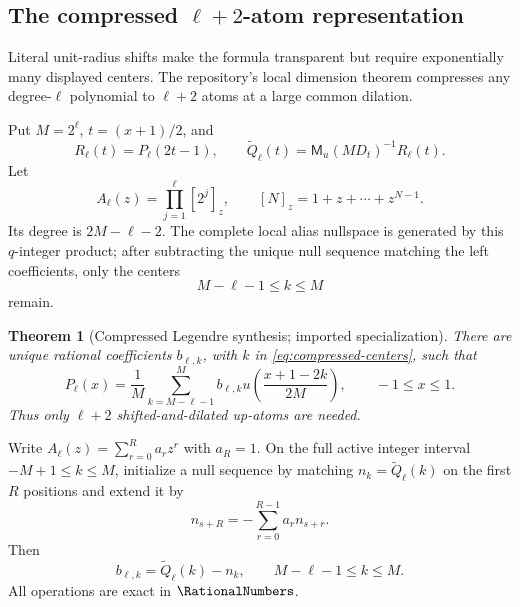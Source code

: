 \documentclass[11pt,oneside]{article}
\numberwithin{equation}{section}
\newtheorem{theorem}{Theorem}[section]
\theoremstyle{definition}
\theoremstyle{remark}
\newcommand{\MM}{\mathsf M}
\begin{document}
\subsection{The compressed $\ell+2$-atom representation}

Literal unit-radius shifts make the formula transparent but require
exponentially many displayed centers.  The repository's local dimension
theorem compresses any degree-$\ell$ polynomial to $\ell+2$ atoms at a large
common dilation.

Put $M=2^\ell$, $t=(x+1)/2$, and
\begin{equation}
 R_\ell(t)=P_\ell(2t-1),
 \qquad
 \widetilde Q_\ell(t)=\MM_u(MD_t)^{-1}R_\ell(t).
 \label{eq:compressed-Q}
\end{equation}
Let
\begin{equation}
 A_\ell(z)=\prod_{j=1}^{\ell}[2^j]_z,
 \qquad [N]_z=1+z+\cdots+z^{N-1}.
 \label{eq:q-annihilator}
\end{equation}
Its degree is $2M-\ell-2$.  The complete local alias nullspace is generated by
this $q$-integer product; after subtracting the unique null sequence matching
the left coefficients, only the centers
\begin{equation}
 M-\ell-1\le k\le M
 \label{eq:compressed-centers}
\end{equation}
remain.

\begin{theorem}[Compressed Legendre synthesis; imported specialization]
\label{thm:compressed-legendre}
There are unique rational coefficients $b_{\ell,k}$, with $k$ in
\eqref{eq:compressed-centers}, such that
\begin{equation}
 \boxed{
 P_\ell(x)=\frac1M\sum_{k=M-\ell-1}^{M}b_{\ell,k}
 u\!\left(\frac{x+1-2k}{2M}\right),
 \qquad -1\le x\le1.}
 \label{eq:compressed-legendre}
\end{equation}
Thus only $\ell+2$ shifted-and-dilated up-atoms are needed.
\end{theorem}

\begin{algorithm}
\label{alg:compression}
Write $A_\ell(z)=\sum_{r=0}^{R}a_rz^r$ with $a_R=1$.  On the full active
integer interval $-M+1\le k\le M$, initialize a null sequence by matching
$n_k=\widetilde Q_\ell(k)$ on the first $R$ positions and extend it by
\begin{equation}
 n_{s+R}=-\sum_{r=0}^{R-1}a_rn_{s+r}.
 \label{eq:null-recurrence}
\end{equation}
Then
\begin{equation}
 b_{\ell,k}=\widetilde Q_\ell(k)-n_k,
 \qquad M-\ell-1\le k\le M.
 \label{eq:compressed-coeffs}
\end{equation}
All operations are exact in $\RationalNumbers$.
\end{algorithm}
\end{document}
